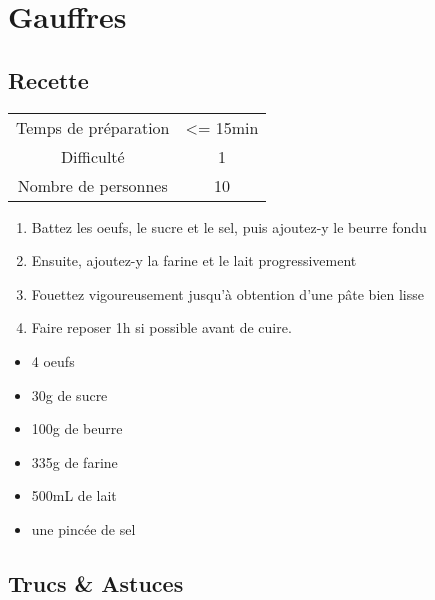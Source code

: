 \newpage
\section{Gauffres}
    \label{sec:Gauffres}
    \subsection{Recette}
    \vspace{1cm}


    \begin{center}
        \begin{tabular}{c|c}
            Temps de préparation & <= 15min \\
            Difficulté & 1 \\
            Nombre de personnes & 10 
        \end{tabular}
    \end{center}{}

    \vspace{1cm}
    \hline
    \vspace{1cm}

    \begin{minipage}{.7\textwidth}
        \begin{enumerate}
            \item Battez les oeufs, le sucre et le sel, puis ajoutez-y le beurre fondu
	    \item Ensuite, ajoutez-y la farine et le lait progressivement
	    \item Fouettez vigoureusement jusqu'à obtention d'une pâte bien lisse
	    \item Faire reposer 1h si possible avant de cuire.

        \end{enumerate}
    \end{minipage}
    \begin{minipage}{.3\textwidth}
        \begin{flushleft}
        \begin{itemize}
            \item 4 oeufs
	    \item 30g de sucre
	    \item 100g de beurre
	    \item 335g de farine
	    \item 500mL de lait
	    \item une pincée de sel

        \end{itemize}
        \end{flushleft}
    \end{minipage}
    
    \vspace{1cm}
    \hline
    \vspace{1cm}
    
    \subsection{Trucs \& Astuces}
        

